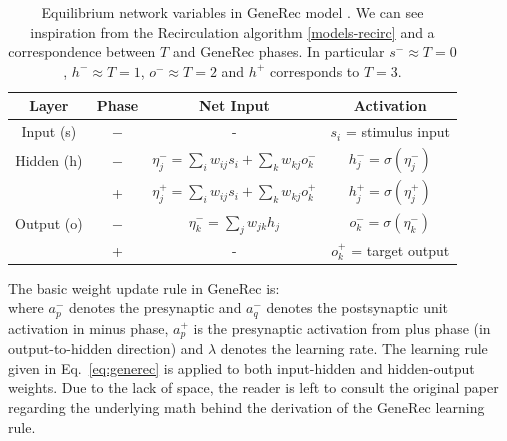 \begin{table}
  \centering
  \begin{tabular}{|cccc|}
    \hline
    Layer & Phase & Net Input & Activation\\
    \hline
    Input (s)    & $-$ & - & $s_i$ = stimulus input\\
    \hline
    Hidden (h)   & $-$ & \hspace{0.3cm}$\eta^{-}_j = \sum_i w_{ij}s_i + \sum_k w_{kj}o^{-}_k$\hspace{0.3cm} &
    $h^{-}_j = \sigma(\eta^{-}_j)$\hspace{0.3cm}\\
          &  +  & $\eta^{+}_j = \sum_{i}w_{ij}s_i + \sum_k w_{kj}o^{+}_k$ & $h^{+}_{j} = \sigma(\eta^{+}_j)$ \\
    \hline
    Output (o) & $-$ & $\eta^{-}_k = \sum_j w_{jk}h_j$ & $o^{-}_k = \sigma(\eta^{-}_k)$\\
           &  +  & - & $o^{+}_k$ = target output \\
    \hline
  \end{tabular}
  \caption{Equilibrium network variables in GeneRec model \citet{o1996bio}. We can see inspiration from the Recirculation algorithm \ref{models-recirc} and a correspondence between $T$ and GeneRec phases. In particular $s^{-} \approx T=0$, $h^{-} \approx T=1$, $o^{-} \approx T=2$ and $h^{+}$ corresponds to $T=3$.}
  \label{tab:generec}
\end{table}

The basic weight update rule in GeneRec is:
\begin{equation}
\label{eq:generec}
\end{equation}
where $a^{-}_p$ denotes the presynaptic and $a^{-}_q$ denotes the postsynaptic unit activation in minus phase, $a^{+}_p$ is the presynaptic activation from plus phase (in output-to-hidden direction) and $\lambda$ denotes the learning rate. The learning rule given in Eq.~\ref{eq:generec} is applied to both input-hidden and hidden-output weights.  Due to the lack of space, the reader is left to consult the original paper \citet{o1996bio} regarding the underlying math behind the derivation of the GeneRec learning rule.

